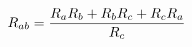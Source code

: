 \documentclass[preview]{standalone}
\begin{document}
\begin{align*}
\special{dvisvgm:raw <g id='unique000'>}R_{ab} = \frac{R_a R_b + R_b R_c + R_c R_a}{R_c}\special{dvisvgm:raw </g>}
\end{align*}
\end{document}
